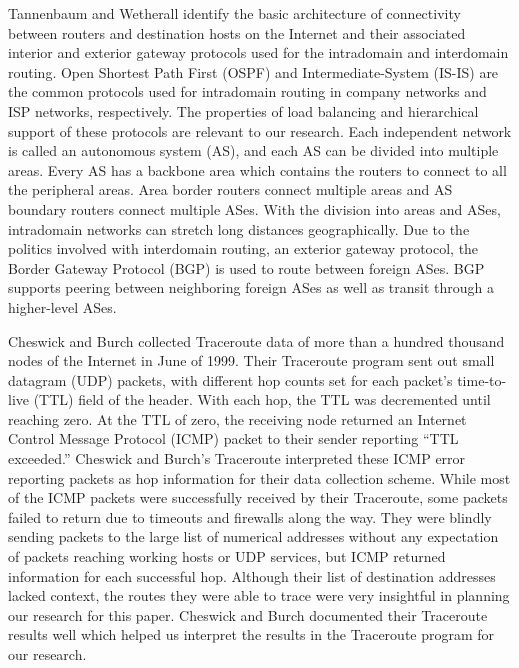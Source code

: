 \documentclass{sigcomm-alternate}
\begin{document}
Tannenbaum and Wetherall \cite{tannenbaum} identify the basic architecture of connectivity between routers and destination hosts on the Internet and their associated interior and exterior gateway protocols used for the intradomain and interdomain routing. Open Shortest Path First (OSPF) and Intermediate-System (IS-IS) are the common protocols used for intradomain routing in company networks and ISP networks, respectively. The properties of load balancing and hierarchical support of these protocols are relevant to our research. Each independent network is called an autonomous system (AS), and each AS can be divided into multiple areas. Every AS has a backbone area which contains the routers to connect to all the peripheral areas. Area border routers connect multiple areas and AS boundary routers connect multiple ASes. With the division into areas and ASes, intradomain networks can stretch long distances geographically. Due to the politics involved with interdomain routing, an exterior gateway protocol, the Border Gateway Protocol (BGP) is used to route between foreign ASes. BGP supports peering between neighboring foreign ASes as well as transit through a higher-level ASes.  

Cheswick and Burch \cite{ches} collected Traceroute data of more than a hundred thousand nodes of the Internet in June of 1999. Their Traceroute program sent out small datagram (UDP) packets, with different hop counts set for each packet’s time-to-live (TTL) field of the header. With each hop, the TTL was decremented until reaching zero. At the TTL of zero, the receiving node returned an Internet Control Message Protocol (ICMP) packet to their sender reporting “TTL exceeded.” Cheswick and Burch’s Traceroute interpreted these ICMP error reporting packets as hop information for their data collection scheme. While most of the ICMP packets were successfully received by their Traceroute, some packets failed to return due to timeouts and firewalls along the way. They were blindly sending packets to the large list of numerical addresses without any expectation of packets reaching working hosts or UDP services, but ICMP returned information for each successful hop. Although their list of destination addresses lacked context, the routes they were able to trace were very insightful in planning our research for this paper. Cheswick and Burch documented their Traceroute results well which helped us interpret the results in the Traceroute program for our research.
\end{document}
